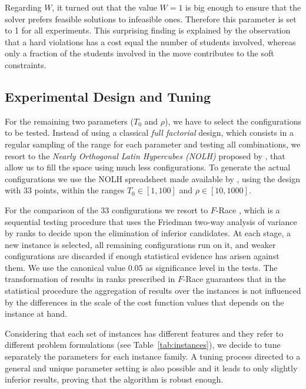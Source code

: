 \documentclass[authoryear,preprint,a4paper,12pt]{elsarticle}
\begin{document}
Regarding $W$, it turned out that the value $W = 1$ is big enough 
to ensure that the solver prefers feasible solutions to infeasible ones.
Therefore this parameter is set to 1 for all experiments.
This surprising finding is explained by the observation that a hard violations 
has a cost equal the number of students involved, whereas only a fraction of the 
students involved in the move contributes to the soft constraints.

\subsection{Experimental Design and Tuning}

For the remaining two parameters ($T_0$ and $\rho$), we have to select
the configurations to be tested. Instead of using a classical
\emph{full factorial} design, which consists in a regular sampling of the range for
each parameter and testing all combinations, we resort to the
\emph{Nearly Orthogonal Latin Hypercubes (NOLH)} proposed by
\citet{CiLu07}, that allow us to fill the space using much less
configurations. To generate the actual configurations we use the NOLH
spreadsheet made available by \citet{Sanc05}, using the design with 33
points, within the ranges $T_0 \in [1,100]$ and $\rho \in [10,1000]$.

For the comparison of the 33 configurations we resort to $F$-Race
\citep{Bira05}, which is a sequential testing procedure
that uses the Friedman two-way analysis of variance by ranks to decide
upon the elimination of inferior candidates. At each stage, a new
instance is selected, all remaining configurations run on it, and weaker
configurations are discarded if enough statistical evidence has arisen
against them.  We use the canonical value $0.05$ as significance level in the
tests.  The transformation of results in ranks prescribed in $F$-Race
guarantees that in the statistical procedure the aggregation of
results over the instances is not influenced by the
differences in the scale of the cost function values that depends on the instance at hand.


Considering that each set of instances has different features and they
refer to different problem formulations (see
Table~\ref{tab:instances}), we decide to tune separately the
parameters for each instance family.
A tuning process directed to a general and unique parameter setting 
is also possible and it leads to only slightly inferior results, 
proving that the algorithm is robust enough. 
\end{document}
